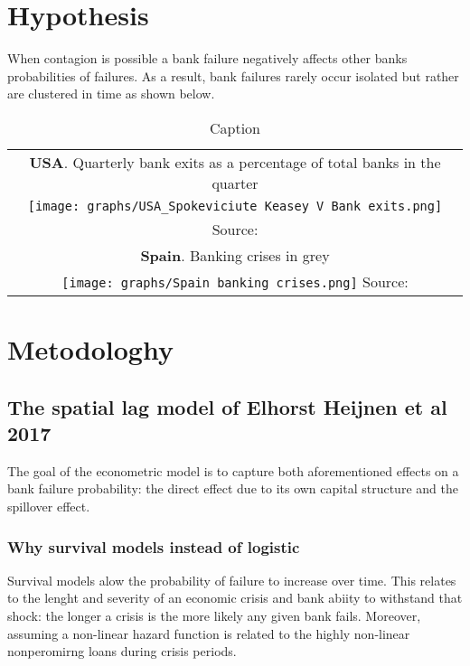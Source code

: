 \documentclass[11pt,final]{article}%
\begin{document}
\section{Hypothesis}

When contagion is possible a bank failure negatively affects other banks probabilities of failures. As a result, bank failures rarely occur isolated but rather are clustered in time as shown below.

\begin{table}[]
    \centering
    \begin{tabular}{c}
         \textbf{USA}. Quarterly bank exits as a percentage of total banks in the quarter \\
         \texttt{[image: graphs/USA\_Spokeviciute Keasey V Bank exits.png]} \\
         Source: \cite{SpokeviciuteKeaseyVallascas2019} \\
        \addlinespace
          \textbf{Spain}. Banking crises in grey \\
         \texttt{[image: graphs/Spain banking crises.png]}
          Source: \cite{BedayoEstradaSaurina2020} \\
    \end{tabular}
    \caption{Caption}
    \label{tab:my_label}
\end{table}

\section{Metodologhy}
\subsection{The spatial lag model of Elhorst Heijnen et al 2017}
The goal of the econometric model is to capture both aforementioned effects on a bank failure probability: the direct effect due to its own capital structure and the spillover effect. 

\subsubsection{Why survival models instead of logistic}
Survival models alow the probability of failure to increase over time. This relates to the lenght and severity of an economic crisis and bank abiity to withstand that shock: the longer a crisis is the more likely any given bank fails. Moreover, assuming a non-linear hazard function is related to the highly non-linear nonperomirng loans during crisis periods. 
\end{document}
